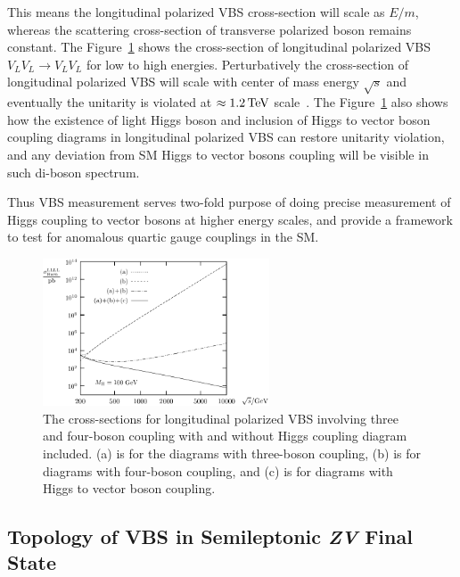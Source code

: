 This means the longitudinal polarized \gls{VBS} cross-section will scale as \( E/m \),
whereas the scattering cross-section of transverse polarized boson remains constant.
The Figure~\ref{fig:vbs-at-high-energies} shows the cross-section
of longitudinal polarized \gls{VBS} \( V_L V_L \to V_L V_L\)
for low to high energies. Perturbatively the cross-section of
longitudinal polarized \gls{VBS} will scale with center of mass energy
\( \sqrt{s} \) and eventually the unitarity is violated at
\( \approx 1.2 \,\text{Te\hspace{-.08em}V}{} \) scale~\cite{Lee1977,Lee1977a}.
The Figure~\ref{fig:vbs-at-high-energies} also shows
how the existence of light Higgs boson and
inclusion of Higgs to vector boson coupling diagrams in longitudinal
polarized \gls{VBS} can restore unitarity violation,
and any deviation from \gls{SM} Higgs to vector
bosons coupling will be visible in such di-boson spectrum.

Thus \gls{VBS} measurement serves two-fold purpose of
doing precise measurement of Higgs coupling to vector bosons
at higher energy scales,
and provide a framework to test for anomalous quartic gauge
couplings in the \gls{SM}.


\begin{figure}[!ht]
  \centering
  \includegraphics[width=0.6\textwidth]{figures/unitarity.pdf}
  \caption[The cross-sections for longitudinal polarized \gls{VBS} involving three
    and four-boson coupling with and without Higgs coupling included.]%
  {The cross-sections for longitudinal polarized \gls{VBS} involving three
    and four-boson coupling with and without Higgs coupling diagram included.
    (a) is for the diagrams with three-boson coupling,
    (b) is for diagrams with four-boson coupling, and (c) is for diagrams
    with Higgs to vector boson coupling.~\cite{Denner1997}}%
  \label{fig:vbs-at-high-energies}
\end{figure}

\subsection{
  Topology of VBS in Semileptonic \textit{ZV} Final State
}

